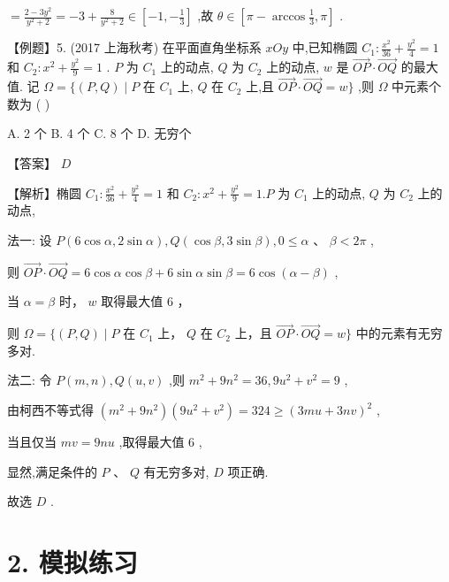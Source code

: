 \documentclass[10pt]{article}
\begin{document}
\(= \frac{2 - 3{y}^{2}}{{y}^{2} + 2} =  - 3 + \frac{8}{{y}^{2} + 2} \in  \left\lbrack  {-1, - \frac{1}{3}}\right\rbrack\) ,故 \(\theta  \in  \left\lbrack  {\pi  - \arccos \frac{1}{3},\pi }\right\rbrack\) .

【例题】5. (2017 上海秋考) 在平面直角坐标系 \({xOy}\) 中,已知椭圆 \({C}_{1} : \frac{{x}^{2}}{36} + \frac{{y}^{2}}{4} = 1\) 和 \({C}_{2} : {x}^{2} + \frac{{y}^{2}}{9} = 1\) . \(P\) 为 \({C}_{1}\) 上的动点, \(Q\) 为 \({C}_{2}\) 上的动点, \(w\) 是 \(\overrightarrow{OP} \cdot  \overrightarrow{OQ}\) 的最大值. 记 \(\Omega  = \{ \left( {P,Q}\right)  \mid  P\) 在 \({C}_{1}\) 上, \(Q\) 在 \({C}_{2}\) 上,且 \(\overrightarrow{OP} \cdot  \overrightarrow{OQ} = w\}\) ,则 \(\Omega\) 中元素个数为 ( )

A. 2 个 B. 4 个 C. 8 个 D. 无穷个

【答案】 \(D\)

【解析】椭圆 \({C}_{1} : \frac{{x}^{2}}{36} + \frac{{y}^{2}}{4} = 1\) 和 \({C}_{2} : {x}^{2} + \frac{{y}^{2}}{9} = 1.P\) 为 \({C}_{1}\) 上的动点, \(Q\) 为 \({C}_{2}\) 上的动点,

法一: 设 \(P\left( {6\cos \alpha ,2\sin \alpha }\right) ,Q\left( {\cos \beta ,3\sin \beta }\right) ,0 \leq  \alpha \text{ 、 }\beta  < {2\pi }\) ,

则 \(\overrightarrow{OP} \cdot  \overrightarrow{OQ} = 6\cos \alpha \cos \beta  + 6\sin \alpha \sin \beta  = 6\cos \left( {\alpha  - \beta }\right)\) ,

当 \(\alpha  = \beta\) 时， \(w\) 取得最大值 6 ，

则 \(\Omega  = \{ \left( {P,Q}\right)  \mid  P\) 在 \({C}_{1}\) 上， \(Q\) 在 \({C}_{2}\) 上，且 \(\overrightarrow{OP} \cdot  \overrightarrow{OQ} = w\}\) 中的元素有无穷多对.

法二: 令 \(P\left( {m,n}\right) ,Q\left( {u,v}\right)\) ,则 \({m}^{2} + 9{n}^{2} = {36},9{u}^{2} + {v}^{2} = 9\) ,

由柯西不等式得 \(\left( {{m}^{2} + 9{n}^{2}}\right) \left( {9{u}^{2} + {v}^{2}}\right)  = {324} \geq  {\left( 3mu + 3nv\right) }^{2}\) ,

当且仅当 \({mv} = {9nu}\) ,取得最大值 6 ,

显然,满足条件的 \(P\text{ 、 }Q\) 有无穷多对, \(D\) 项正确.

故选 \(D\) .

\section*{2. 模拟练习}
\end{document}

